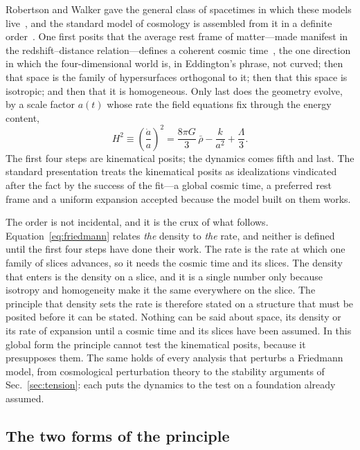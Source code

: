 \documentclass[aps,prd,reprint,amsmath,amssymb,superscriptaddress]{revtex4-2}
\begin{document}
Robertson and Walker gave the general class of spacetimes in which these models live~\cite{Robertson1929, Robertson1933, Robertson1935, Walker1937}, and the standard model of cosmology is assembled from it in a definite order~\cite{north1965}. One first posits that the average rest frame of matter---made manifest in the redshift--distance relation---defines a coherent cosmic time~\cite{Weyl1923}, the one direction in which the four-dimensional world is, in Eddington's phrase, not curved; then that space is the family of hypersurfaces orthogonal to it; then that this space is isotropic; and then that it is homogeneous. Only last does the geometry evolve, by a scale factor $a(t)$ whose rate the field equations fix through the energy content,
\begin{equation}
H^{2}\equiv\left(\frac{\dot a}{a}\right)^{2} = \frac{8\pi G}{3}\,\bar\rho - \frac{k}{a^{2}} + \frac{\Lambda}{3}.
\label{eq:friedmann}
\end{equation}
The first four steps are kinematical posits; the dynamics comes fifth and last. The standard presentation treats the kinematical posits as idealizations vindicated after the fact by the success of the fit---a global cosmic time, a preferred rest frame and a uniform expansion accepted because the model built on them works.

The order is not incidental, and it is the crux of what follows. Equation~\eqref{eq:friedmann} relates \emph{the} density to \emph{the} rate, and neither is defined until the first four steps have done their work. The rate is the rate at which one family of slices advances, so it needs the cosmic time and its slices. The density that enters is the density on a slice, and it is a single number only because isotropy and homogeneity make it the same everywhere on the slice. The principle that density sets the rate is therefore stated on a structure that must be posited before it can be stated. Nothing can be said about space, its density or its rate of expansion until a cosmic time and its slices have been assumed. In this global form the principle cannot test the kinematical posits, because it presupposes them. The same holds of every analysis that perturbs a Friedmann model, from cosmological perturbation theory to the stability arguments of Sec.~\ref{sec:tension}: each puts the dynamics to the test on a foundation already assumed.

\subsection{The two forms of the principle}\label{sec:twoforms}
\end{document}
